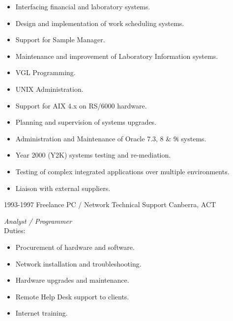 \documentclass[]{friggeri-cv} %
\begin{document}
\begin{entrylist}
{\begin{itemize}
\item Interfacing financial and laboratory systems.
\item Design and implementation of work scheduling systems.
\item Support for Sample Manager.
\item Maintenance and improvement of Laboratory Information systems.
\item VGL Programming.
\item UNIX Administration.
\item Support for AIX 4.x on RS/6000 hardware.
\item Planning and supervision of systems upgrades.
\item Administration and Maintenance of Oracle 7.3, 8 \& 9i systems.
\item Year 2000 (Y2K) systems testing and re-mediation.
\item Testing of complex integrated applications over multiple environments.
\item Liaison with external suppliers.
\end{itemize}}
\entry
{1993-1997}
{Freelance PC / Network Technical Support}
{Canberra, ACT}
{\emph{Analyst / Programmer} \\
Duties:
\begin{itemize}
\item Procurement of hardware and software.
\item Network installation and troubleshooting.
\item Hardware upgrades and maintenance.
\item Remote Help Desk support to clients.
\item Internet training.
\end{itemize}}
\end{entrylist}
\end{document}
